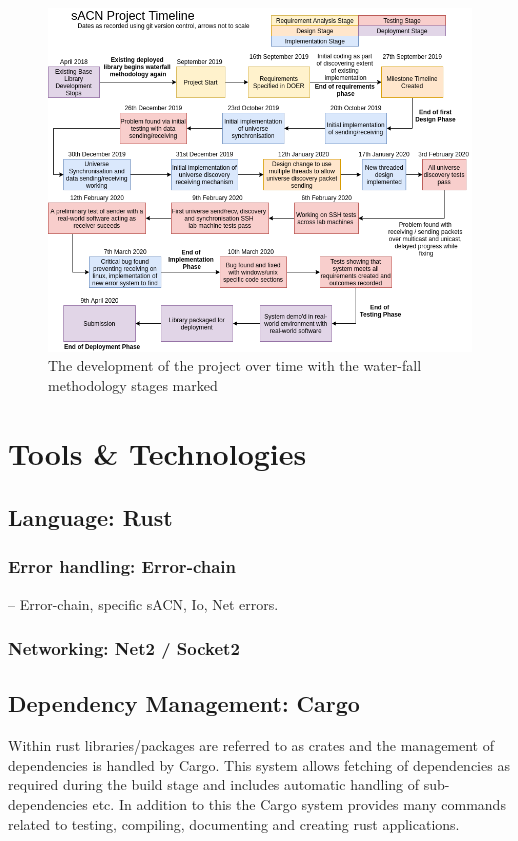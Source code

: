 \documentclass[11pt,a4paper]{report}
\begin{document}
\begin{figure}[H]
\label{project_dev_timeline}
\includegraphics[width=\textwidth]{CS4099-dev-timeline}
\caption{The development of the project over time with the water-fall methodology stages marked}
\end{figure}


\section{Tools \& Technologies}
\subsection{Language: Rust}
\subsubsection{Error handling: Error-chain}
-- Error-chain, specific sACN, Io, Net errors.
\subsubsection{Networking: Net2 / Socket2}
\subsection{Dependency Management: Cargo}
Within rust libraries/packages are referred to as crates and the management of dependencies is handled by Cargo. This system allows fetching of dependencies as required during the build stage and includes automatic handling of sub-dependencies etc. In addition to this the Cargo system provides many commands related to testing, compiling, documenting and creating rust applications.
\end{document}
